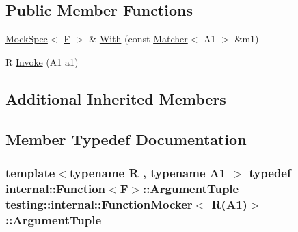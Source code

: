 \subsection*{Public Member Functions}
\begin{DoxyCompactItemize}
\item 
\hyperlink{classtesting_1_1internal_1_1_mock_spec}{Mock\+Spec}$<$ \hyperlink{classtesting_1_1internal_1_1_function_mocker_3_01_r_07_a1_08_4_ada54286442ab14a18c2308cef748848f}{F} $>$ \& \hyperlink{classtesting_1_1internal_1_1_function_mocker_3_01_r_07_a1_08_4_aa61b5c24c52b8c49713774c49a01b26e}{With} (const \hyperlink{classtesting_1_1_matcher}{Matcher}$<$ A1 $>$ \&m1)
\item 
R \hyperlink{classtesting_1_1internal_1_1_function_mocker_3_01_r_07_a1_08_4_a4a58d37902572c8136d999c5008dce1a}{Invoke} (A1 a1)
\end{DoxyCompactItemize}
\subsection*{Additional Inherited Members}


\subsection{Member Typedef Documentation}
\subsubsection[{\texorpdfstring{Argument\+Tuple}{ArgumentTuple}}]{\setlength{\rightskip}{0pt plus 5cm}template$<$typename R , typename A1 $>$ typedef {\bf internal\+::\+Function}$<${\bf F}$>$\+::{\bf Argument\+Tuple} {\bf testing\+::internal\+::\+Function\+Mocker}$<$ R(A1)$>$\+::{\bf Argument\+Tuple}}\hypertarget{classtesting_1_1internal_1_1_function_mocker_3_01_r_07_a1_08_4_aacec6412ac4343c071d7dfe965558b0b}{}\label{classtesting_1_1internal_1_1_function_mocker_3_01_r_07_a1_08_4_aacec6412ac4343c071d7dfe965558b0b}
